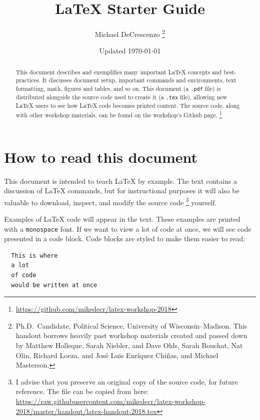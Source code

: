 \documentclass[12pt]{article}
\begin{document}
\title{{\LaTeX} Starter Guide}
\author{Michael DeCrescenzo%
          \thanks{Ph.D.\ Candidate, Political Science, University of Wisconsin--Madison. This handout borrows heavily past workshop materials created and passed down by Matthew Holleque, Sarah Niebler, and Dave Ohls, Sarah Bouchat, Nat Olin, Richard Loeza, and Jos\'e Luis Enr\'iquez Chi\~nas, and Michael Masterson.}}
\date{Updated \today}
\maketitle


\begin{abstract}
  This document describes and exemplifies many important {\LaTeX} concepts and best-practices. It discusses document setup, important commands and environments, text formatting, math, figures and tables, and so on. This document (a \lstinline{.pdf} file) is distributed alongside the source code used to create it (a \lstinline{.tex} file), allowing new {\LaTeX} users to see how {\LaTeX} code becomes printed content. The source code, along with other workshop materials, can be found on the workshop's Github page.%
    \footnote{\url{https://github.com/mikedecr/latex-workshop-2018}}
\end{abstract}



\section{How to read this document}

This document is intended to teach {\LaTeX} by example. The text contains a discussion of {\LaTeX} commands, but for instructional purposes it will also be valuable to download, inspect, and modify the source code%
  \footnote{I advise that you preserve an original copy of the source code, for future reference. The file can be copied from here: \url{https://raw.githubusercontent.com/mikedecr/latex-workshop-2018/master/handout/latex-handout-2018.tex}} yourself. 

Examples of {\LaTeX} code will appear in the text. These examples are printed with a \lstinline{monospace} font. If we want to view a lot of code at once, we will see code presented in a code block. Code blocks are styled to make them easier to read:

\begin{lstlisting}
  This is where
  a lot
  of code
  would be written at once
\end{lstlisting}
\end{document}
